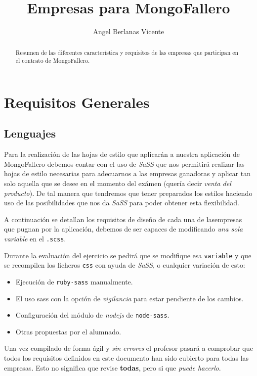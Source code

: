 \documentclass[a4paper,10pt]{article}
\title{Empresas para MongoFallero}
\author{Angel Berlanas Vicente}
\begin{document}
\maketitle

\begin{abstract}
Resumen de las diferentes característica y requisitos de las empresas que participan en el contrato de MongoFallero. 
\end{abstract}

\tableofcontents

\section{Requisitos Generales}

\subsection{Lenguajes}

Para la realización de las hojas de estilo que aplicarán a nuestra aplicación de MongoFallero debemos contar con el uso de \textit{SaSS} que nos permitirá realizar las hojas de estilo necesarias para adecuarnos a las empresas ganadoras y aplicar tan solo aquella que se desee en el momento del exámen (quería decir \textit{venta del producto}). De tal manera que tendremos que tener preparados los estilos haciendo uso de las posibilidades que nos da \textit{SaSS} para poder obtener esta flexibilidad.

A continuación se detallan los requisitos de diseño de cada una de lasempresas que pugnan por la aplicación, debemos de ser capaces de modificando \textit{una sola variable} en el \texttt{.scss}.

Durante la evaluación del ejercicio se pedirá que se modifique esa \texttt{variable} y que se recompilen los ficheros \texttt{css} con ayuda de \textit{SaSS}, o cualquier variación de esto:

\begin{itemize}
\item Ejecución de \texttt{ruby-sass} manualmente.
\item El uso sass con la opción de \textit{vigilancia} para estar pendiente de los cambios.
\item Configuración del módulo de \textit{nodejs} de \texttt{node-sass}.
\item Otras propuestas por el alumnado.
\end{itemize}

Una vez compilado de forma ágil y \textit{sin errores} el profesor pasará a comprobar que todos los requisitos definidos en este documento han sido cubierto para todas las empresas. Esto no significa que revise \textbf{todas}, pero si que \textit{puede hacerlo}.
\end{document}
